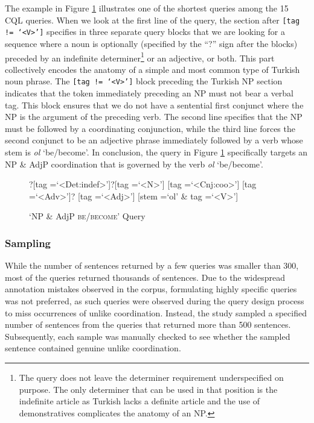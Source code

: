 \begin{sloppypar}
The example in Figure \ref{CQl_sur} illustrates one of the shortest queries among the 15 CQL queries.  When we look at the first line of the query, the section after \mbox{\texttt{[tag != `<V>']}} specifies in three separate query blocks that we are looking for a sequence where a noun is optionally (specified by the ``?'' sign after the blocks) preceded by an indefinite determiner\footnote{The query does not leave the determiner requirement underspecified on purpose. The only determiner that can be used in that position is the indefinite article as Turkish lacks a definite article and the use of demonstratives complicates the anatomy of an NP.} or an adjective, or both. This part collectively encodes the anatomy of a simple and most common type of Turkish noun phrase. The \mbox{\texttt{[tag != `<V>']}} block preceding the Turkish NP section indicates that the token immediately preceding an NP must not bear a verbal tag. This block ensures that we do not have a sentential first conjunct where the NP is the argument of the preceding verb. The second line specifies that the NP must be followed by a coordinating conjunction, while the third line forces the second conjunct to be an adjective phrase immediately followed by a verb whose stem is \textit{ol} `be/become'. In conclusion, the query in Figure \ref{CQl_sur} specifically targets an NP \& AdjP coordination that is governed by the verb \textit{ol} `be/become'. \end{sloppypar}

\begin{figure}[!h]
\begin{small}
\begin{spverbatim}
	[tag !=`<V>'][tag =`<Adj>']?[tag =`<Det:indef>']?[tag =`<N>'] 
	[tag =`<Cnj:coo>']
	[tag =`<Adv>']? [tag =`<Adj>'] [stem =`ol' & tag =`<V>']
\end{spverbatim}
\end{small}
    \caption{`NP \& AdjP \textsc{be/become}' Query}
	\label{CQl_sur}
\end{figure}


\subsubsection{Sampling}
While the number of sentences returned by a few queries was smaller than 300, most of the queries returned thousands of sentences. Due to the widespread annotation mistakes observed in the corpus, formulating highly specific queries was not preferred, as such queries were observed during the query design process to miss occurrences of unlike coordination. Instead, the study sampled a specified number of sentences from the queries that returned more than 500 sentences. Subsequently, each sample was manually checked to see whether the sampled sentence contained genuine unlike coordination.  

